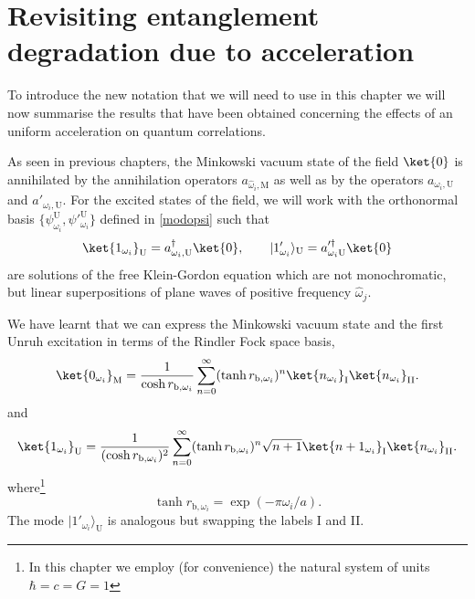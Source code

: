 



\section{Revisiting entanglement degradation due to acceleration}


To introduce the new notation that we will need to use in this chapter we will now summarise the results that have been obtained concerning
the effects of an uniform acceleration on quantum correlations. 

As seen in previous chapters, the Minkowski vacuum state of the field $\ket{0}$ is
annihilated by the annihilation operators $a_{\hat\omega_i,\text{M}}$ as well as
by the operators $a_{\omega_i,\text{U}}$ and $a'_{\omega_i,\text{U}}$. For the excited states of the field,
we will work with the orthonormal basis $\{\psi^\text{U}_{\omega_i},\psi'^{\text{U}}_{\omega_i}\}$
defined in \eqref{modopsi} such that
\begin{equation}\label{onepartgoodb}
\ket{1_{\omega_i}}_\text{U}=a_{\omega_i,\text{U}}^\dagger \ket{0},\qquad |1'_{\omega_i}\rangle_\text{U}=a'^\dagger_{\omega_i\text{U}} \ket{0}
\end{equation}
are solutions of the free Klein-Gordon equation which are not
monochromatic, but linear superpositions of plane waves of positive
frequency $\hat\omega_j$.

We have learnt that we can express the Minkowski vacuum
state and the first Unruh excitation in terms of the Rindler Fock space basis,
\begin{equation}\label{scavacinf1}
\ket{0_{\omega_i}}_\text{M}=\frac{1}{\cosh r_{\text{b},\omega_i}}\sum_{n=0}^\infty
(\tanh r_{\text{b},\omega_i})^n \ket{n_{\omega_i}}_\text{I}\ket{n_{\omega_i}}_{\text{II}}.
\end{equation}
and
\begin{equation}\label{unoinf1}
\ket{1_{\omega_i}}_\text{U}=\frac{1}{(\cosh r_{\text{b},\omega_i})^2}
\sum_{n=0}^{\infty}  (\tanh  r_{\text{b},\omega_i})^n
\sqrt{n+1}\ket{n+1_{\omega_i}}_\text{I} \ket{n_{\omega_i}}_{\text{II}}.
\end{equation}
where\footnote{In this chapter we employ (for convenience) the natural system of units $\hbar=c=G=1$}
\begin{equation}
\tanh r_{\text{b},\omega_i}=\exp(-\pi \omega_i/a).
\end{equation}
The mode $ |1'_{\omega_i}\rangle_\text{U}$ is analogous but swapping the labels I and II.


